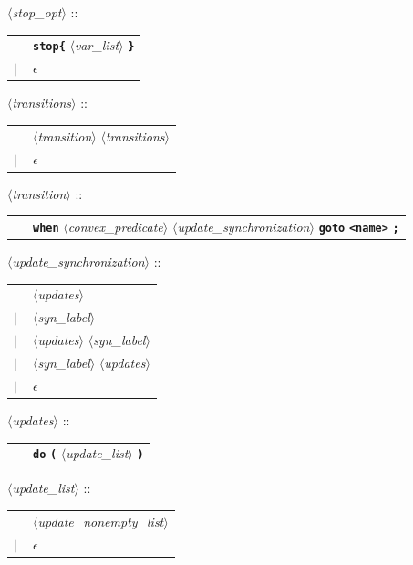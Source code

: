 \documentclass[a4paper,11pt]{article}
\newcommand{\emptystring}{$\epsilon$}
\newcommand{\nt}[1]{$\langle$\emph{#1}$\rangle$}
\newcommand{\regleGrammaire}[1]{\bigskip \noindent \nt{#1} :: \\}
\newcommand{\code}[1]{\textbf{\texttt{#1}}}
\begin{document}
\regleGrammaire{stop\_opt}
\begin{tabular}{l l}
	\ & \code{stop\{} \nt{var\_list} \code{\}} \\
	$|$ & \emptystring \\
\end{tabular}

	
\regleGrammaire{transitions}
\begin{tabular}{l l}
	\  & \nt{transition} \nt{transitions} \\
	$|$ & \emptystring \\
\end{tabular}

\regleGrammaire{transition}
\begin{tabular}{l l}
	\  & \code{when} \nt{convex\_predicate} \nt{update\_synchronization} \code{goto} \code{<name>} \code{;} \\
\end{tabular}

\regleGrammaire{update\_synchronization}
\begin{tabular}{l l}
	\  & \nt{updates} \\
	$|$ & \nt{syn\_label} \\
	$|$ & \nt{updates} \nt{syn\_label} \\
	$|$ & \nt{syn\_label} \nt{updates} \\
	$|$ & \emptystring \\
\end{tabular}

\regleGrammaire{updates}
\begin{tabular}{l l}
	\  & \code{do} \code{(} \nt{update\_list} \code{)} \\
\end{tabular}

\regleGrammaire{update\_list}
\begin{tabular}{l l}
	\  & \nt{update\_nonempty\_list} \\
	$|$ & \emptystring \\
\end{tabular}
\end{document}
